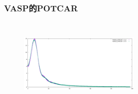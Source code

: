 {\frame
{
	\frametitle{\rm{VASP}的\rm{POTCAR}}
\begin{minipage}{0.40\textwidth}
\centering
\fontsize{2.7pt}{1.2pt}\selectfont{
}
\end{minipage}
\begin{minipage}{0.58\textwidth}
{\fontsize{5.5pt}{4.2pt}}
\begin{figure}[t!]
\centering
\vspace{-0.15in}
\includegraphics[width=2.3in,height=1.75in,viewport=0 0 1150 650, clip]{Figures/POT_G-dat.pdf}
\label{local-potential}
\end{figure}
\end{minipage}
}

}
